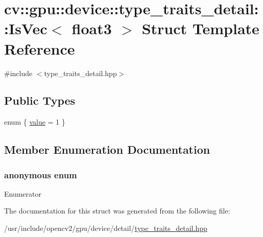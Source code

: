 \hypertarget{structcv_1_1gpu_1_1device_1_1type__traits__detail_1_1IsVec_3_01float3_01_4}{\section{cv\-:\-:gpu\-:\-:device\-:\-:type\-\_\-traits\-\_\-detail\-:\-:Is\-Vec$<$ float3 $>$ Struct Template Reference}
\label{structcv_1_1gpu_1_1device_1_1type__traits__detail_1_1IsVec_3_01float3_01_4}
}


{\ttfamily \#include $<$type\-\_\-traits\-\_\-detail.\-hpp$>$}

\subsection*{Public Types}
\begin{DoxyCompactItemize}
\item 
enum \{ \hyperlink{structcv_1_1gpu_1_1device_1_1type__traits__detail_1_1IsVec_3_01float3_01_4_a5d546e3b3adc01dd0e38d06f31dac3c5aa18dddede0bc55139ea312ef307e199c}{value} = 1
 \}
\end{DoxyCompactItemize}


\subsection{Member Enumeration Documentation}
\hypertarget{structcv_1_1gpu_1_1device_1_1type__traits__detail_1_1IsVec_3_01float3_01_4_a5d546e3b3adc01dd0e38d06f31dac3c5}{\subsubsection[{anonymous enum}]{\setlength{\rightskip}{0pt plus 5cm}anonymous enum}}\label{structcv_1_1gpu_1_1device_1_1type__traits__detail_1_1IsVec_3_01float3_01_4_a5d546e3b3adc01dd0e38d06f31dac3c5}
\begin{Desc}
\item[Enumerator]\par
\begin{description}
\item[{\em 
\hypertarget{structcv_1_1gpu_1_1device_1_1type__traits__detail_1_1IsVec_3_01float3_01_4_a5d546e3b3adc01dd0e38d06f31dac3c5aa18dddede0bc55139ea312ef307e199c}{value}\label{structcv_1_1gpu_1_1device_1_1type__traits__detail_1_1IsVec_3_01float3_01_4_a5d546e3b3adc01dd0e38d06f31dac3c5aa18dddede0bc55139ea312ef307e199c}
}]\end{description}
\end{Desc}


The documentation for this struct was generated from the following file\-:\begin{DoxyCompactItemize}
\item 
/usr/include/opencv2/gpu/device/detail/\hyperlink{type__traits__detail_8hpp}{type\-\_\-traits\-\_\-detail.\-hpp}\end{DoxyCompactItemize}

